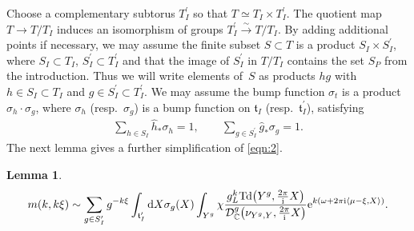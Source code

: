 \documentclass[11pt]{article}
\numberwithin{equation}{section}
\newtheorem{Lemma}[Theorem]{Lemma}
\newcommand{\pair}[2]{\langle #1, #2 \rangle}
\renewcommand{\i}{{\mathrm{i}}}
\def\t{\ensuremath{\mathfrak{t}}}
\def\bC{\ensuremath{\mathbb{C}}}
\def\Td{\ensuremath{\textnormal{Td}}}
\def\calDC{\ensuremath{\mathcal{D}_{\bC}}}
\begin{document}
Choose a complementary subtorus $T_I^\prime$ so that $T\simeq T_I \times T_I^\prime$. The quotient map $T \rightarrow T/T_I$ induces an isomorphism of groups $T_I^\prime \xrightarrow{\sim}T/T_I$.
By adding additional points if necessary, we may assume the finite subset $S\subset T$ is a product $S_I\times S_I^\prime$, where $S_I \subset T_I$, $S_I^\prime \subset T_I^\prime$ and that the image of $S_I^\prime$ in $T/T_I$ contains the set $S_P$ from the introduction. Thus we will write elements of~$S$ as products $hg$ with $h \in S_I \subset T_I$ and $g \in S_I^\prime \subset T_I^\prime$. We may assume the bump function $\sigma_t$ is a product $\sigma_h \cdot \sigma_g$, where $\sigma_h$ (resp.~$\sigma_g$) is a bump function on $\t_I$ (resp.~$\t_I^\prime$), satisfying
\begin{gather}\label{eqn:Sum1}
 \sum_{h \in S_I} \hat{h}_\ast\sigma_h=1, \qquad \sum_{g \in S_I^\prime} \hat{g}_\ast\sigma_g=1.
\end{gather}
The next lemma gives a further simplification of \eqref{eqn:2}.
\begin{Lemma}
\begin{gather}
\label{eqn:Asympt2}
m(k,k\xi)\sim \sum_{g \in S_I^\prime}g^{-k\xi} \int_{\t_I^\prime}{\rm d} X\sigma_g(X) \int_{Y^g} \chi \frac{g_L^k\Td\big(Y^g,\tfrac{2\pi}{\i}X\big)}{\calDC^g\big(\nu_{Y^g,Y},\tfrac{2\pi}{\i}X\big)}{\rm e}^{k(\omega+2\pi \i\pair{\mu-\xi}{X})}.
\end{gather}
\end{Lemma}
\end{document}

